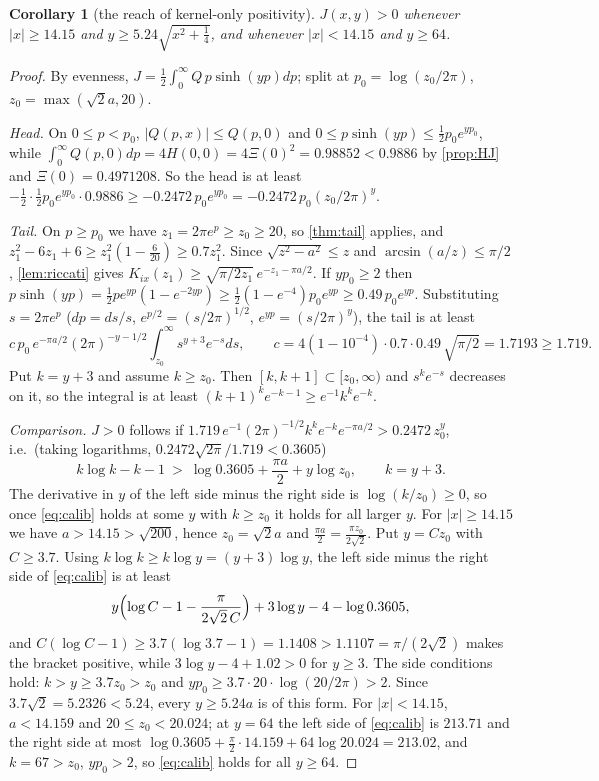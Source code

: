 \documentclass[11pt]{article}
\newtheorem{corollary}[theorem]{Corollary}
\theoremstyle{definition}\newtheorem{definition}[theorem]{Definition}
\theoremstyle{remark}\newtheorem{remark}[theorem]{Remark}
\begin{document}
\begin{corollary}[the reach of kernel-only positivity]\label{cor:calib}
$J(x,y)>0$ whenever $|x|\ge14.15$ and $y\ge5.24\sqrt{x^2+\frac14}$, and whenever $|x|<14.15$ and $y\ge64$.
\end{corollary}
\begin{proof}
By evenness, $J=\frac12\int_0^\infty Q\,p\sinh(yp)dp$; split at $p_0=\log(z_0/2\pi)$, $z_0=\max(\sqrt2a,20)$.

\emph{Head.} On $0\le p<p_0$, $|Q(p,x)|\le Q(p,0)$ and $0\le p\sinh(yp)\le\frac12p_0e^{yp_0}$, while $\int_0^\infty Q(p,0)dp=4H(0,0)=4\Xi(0)^2=0.98852<0.9886$ by \cref{prop:HJ} and $\Xi(0)=0.4971208$. So the head is at least $-\frac12\cdot\frac12p_0e^{yp_0}\cdot0.9886\ge-0.2472\,p_0e^{yp_0}=-0.2472\,p_0(z_0/2\pi)^y$.

\emph{Tail.} On $p\ge p_0$ we have $z_1=2\pi e^p\ge z_0\ge20$, so \cref{thm:tail} applies, and $z_1^2-6z_1+6\ge z_1^2(1-\frac6{20})\ge0.7z_1^2$. Since $\sqrt{z^2-a^2}\le z$ and $\arcsin(a/z)\le\pi/2$, \cref{lem:riccati} gives $K_{ix}(z_1)\ge\sqrt{\pi/2z_1}\,e^{-z_1-\pi a/2}$. If $yp_0\ge2$ then $p\sinh(yp)=\frac12pe^{yp}(1-e^{-2yp})\ge\frac12(1-e^{-4})p_0e^{yp}\ge0.49\,p_0e^{yp}$. Substituting $s=2\pi e^p$ ($dp=ds/s$, $e^{p/2}=(s/2\pi)^{1/2}$, $e^{yp}=(s/2\pi)^y$), the tail is at least
\[
c\,p_0\,e^{-\pi a/2}(2\pi)^{-y-1/2}\int_{z_0}^\infty s^{y+3}e^{-s}ds,\qquad c=4(1-10^{-4})\cdot0.7\cdot0.49\,\sqrt{\pi/2}=1.7193\ge1.719 .
\]
Put $k=y+3$ and assume $k\ge z_0$. Then $[k,k+1]\subset[z_0,\infty)$ and $s^ke^{-s}$ decreases on it, so the integral is at least $(k+1)^ke^{-k-1}\ge e^{-1}k^ke^{-k}$.

\emph{Comparison.} $J>0$ follows if $1.719\,e^{-1}(2\pi)^{-1/2}k^ke^{-k}e^{-\pi a/2}>0.2472\,z_0^y$, i.e.\ (taking logarithms, $0.2472\sqrt{2\pi}/1.719<0.3605$)
\begin{equation}\label{eq:calib}
k\log k-k-1\ >\ \log0.3605+\frac{\pi a}2+y\log z_0,\qquad k=y+3 .
\end{equation}
The derivative in $y$ of the left side minus the right side is $\log(k/z_0)\ge0$, so once \eqref{eq:calib} holds at some $y$ with $k\ge z_0$ it holds for all larger $y$. For $|x|\ge14.15$ we have $a>14.15>\sqrt{200}$, hence $z_0=\sqrt2a$ and $\frac{\pi a}2=\frac{\pi z_0}{2\sqrt2}$. Put $y=Cz_0$ with $C\ge3.7$. Using $k\log k\ge k\log y=(y+3)\log y$, the left side minus the right side of \eqref{eq:calib} is at least
\[
y\Bigl(\log C-1-\frac{\pi}{2\sqrt2\,C}\Bigr)+3\log y-4-\log0.3605 ,
\]
and $C(\log C-1)\ge3.7(\log3.7-1)=1.1408>1.1107=\pi/(2\sqrt2)$ makes the bracket positive, while $3\log y-4+1.02>0$ for $y\ge3$. The side conditions hold: $k>y\ge3.7z_0>z_0$ and $yp_0\ge3.7\cdot20\cdot\log(20/2\pi)>2$. Since $3.7\sqrt2=5.2326<5.24$, every $y\ge5.24a$ is of this form. For $|x|<14.15$, $a<14.159$ and $20\le z_0<20.024$; at $y=64$ the left side of \eqref{eq:calib} is $213.71$ and the right side at most $\log0.3605+\frac\pi2\cdot14.159+64\log20.024=213.02$, and $k=67>z_0$, $yp_0>2$, so \eqref{eq:calib} holds for all $y\ge64$.
\end{proof}
\end{document}
